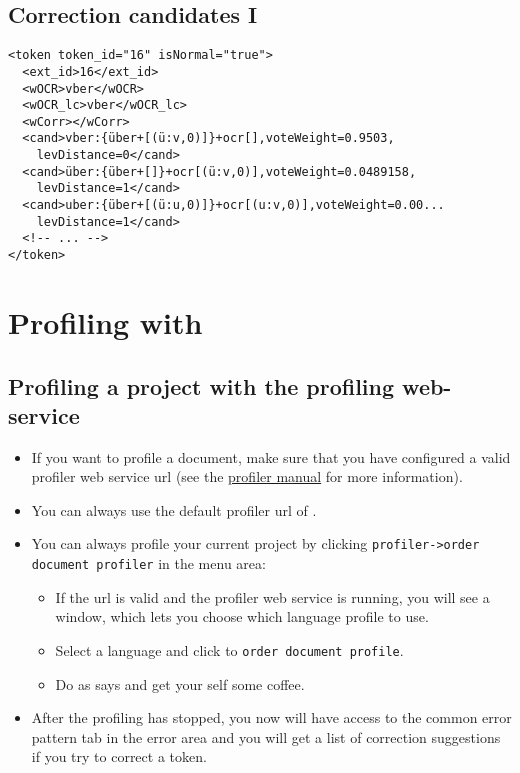 \subsection{Correction candidates I}
\begin{frame}[fragile]
	\begin{verbatim}
<token token_id="16" isNormal="true">
  <ext_id>16</ext_id>
  <wOCR>vber</wOCR>
  <wOCR_lc>vber</wOCR_lc>
  <wCorr></wCorr>
  <cand>vber:{über+[(ü:v,0)]}+ocr[],voteWeight=0.9503,
    levDistance=0</cand>
  <cand>über:{über+[]}+ocr[(ü:v,0)],voteWeight=0.0489158,
    levDistance=1</cand>
  <cand>uber:{über+[(ü:u,0)]}+ocr[(u:v,0)],voteWeight=0.00...
    levDistance=1</cand>
  <!-- ... -->
</token>
	\end{verbatim}
\end{frame}

\section{Profiling with \pocoto}
\subsection{Profiling a project with the profiling web-service}
\begin{frame}
	\begin{itemize}
		\item If you want to profile a document, make sure that you have
			configured a valid profiler web service url (see the
			\href{https://github.com/cisocrgroup/Resources/blob/master/manuals/profiler-manual.md}{profiler
			manual} for more information).
		\item You can always use the default profiler url of \pocoto{}.
		\item You can always profile your current project by clicking
			\texttt{profiler->order document profiler} in the menu area:
					\begin{itemize}
						\item If the url is valid and the profiler web service is running, you
							will see a window, which lets you choose which language profile
							to use.
						\item Select a language and click to \texttt{order document profile}.
						\item Do as \pocoto{} says and get your self some coffee.
					\end{itemize}
				\item After the profiling has stopped, you now will have access to the
					common error pattern tab in the error area and you will get a list
					of correction suggestions if you try to correct a token.
	\end{itemize}
\end{frame}

